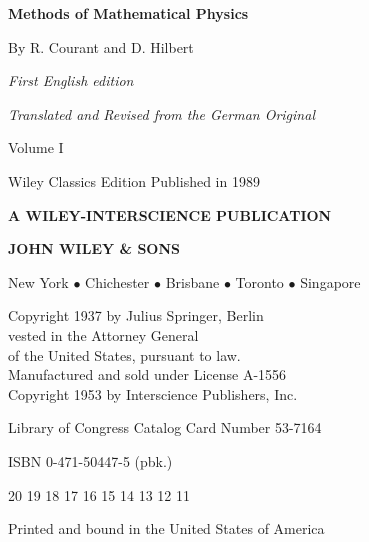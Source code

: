 \thispagestyle{empty}
\vspace*{0.10\textheight}
\begin{center}
{\sffamily\bfseries\LARGE Methods of Mathematical Physics\par}
\vspace{2.0em}
{\large By R. Courant and D. Hilbert\par}
\vspace{1.6em}
{\itshape First English edition\par}
{\itshape Translated and Revised from the German Original\par}
\vspace{1.5em}
{\Large Volume I\par}
\vspace{1.6em}
{\large Wiley Classics Edition Published in 1989\par}
\vfill
{\sffamily\bfseries A WILEY-INTERSCIENCE PUBLICATION\par}
\vspace{0.6em}
{\sffamily\bfseries\Large JOHN WILEY \& SONS\par}
\vspace{0.35em}
{\small New York $\bullet$ Chichester $\bullet$ Brisbane $\bullet$ Toronto $\bullet$ Singapore\par}
\end{center}
\clearpage

\thispagestyle{empty}
\vspace*{0.13\textheight}
\begin{flushleft}
Copyright 1937 by Julius Springer, Berlin\\
vested in the Attorney General\\
of the United States, pursuant to law.\\
Manufactured and sold under License A-1556\\
Copyright 1953 by Interscience Publishers, Inc.

\vspace{1.7em}
Library of Congress Catalog Card Number 53-7164

\vspace{1.7em}
ISBN 0-471-50447-5 (pbk.)

\vspace{1.7em}
20 19 18 17 16 15 14 13 12 11

\vspace{1.7em}
Printed and bound in the United States of America
\end{flushleft}
\clearpage
